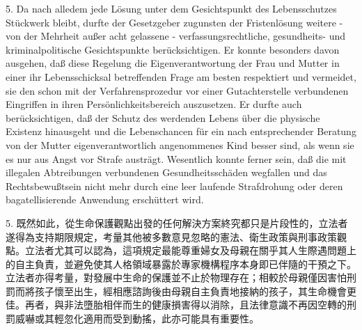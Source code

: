 \documentclass[12pt]{article}
\begin{document}
\syncleft
\begin{sourcepara}
5. Da nach alledem jede Lösung unter dem Gesichtspunkt des Lebensschutzes Stückwerk bleibt, durfte der Gesetzgeber zugunsten der Fristenlösung weitere - von der Mehrheit außer acht gelassene - verfassungsrechtliche, gesundheits- und kriminalpolitische Gesichtspunkte berücksichtigen. Er konnte besonders davon ausgehen, daß diese Regelung die Eigenverantwortung der Frau und Mutter in einer ihr Lebensschicksal betreffenden Frage am besten respektiert und vermeidet, sie den schon mit der Verfahrensprozedur vor einer Gutachterstelle verbundenen Eingriffen in ihren Persönlichkeitsbereich auszusetzen. Er durfte auch berücksichtigen, daß der Schutz des werdenden Lebens über die physische Existenz hinausgeht und die Lebenschancen für ein nach entsprechender Beratung von der Mutter eigenverantwortlich angenommenes Kind besser sind, als wenn sie es nur aus Angst vor Strafe austrägt. Wesentlich konnte ferner sein, daß die mit illegalen Abtreibungen verbundenen Gesundheitsschäden wegfallen und das Rechtsbewußtsein nicht mehr durch eine leer laufende Strafdrohung oder deren bagatellisierende Anwendung erschüttert wird.
\end{sourcepara}
\begin{transpara}
5. 既然如此，從生命保護觀點出發的任何解決方案終究都只是片段性的，立法者遂得為支持期限規定，考量其他被多數意見忽略的憲法、衛生政策與刑事政策觀點。立法者尤其可以認為，這項規定最能尊重婦女及母親在關乎其人生際遇問題上的自主負責，並避免使其人格領域暴露於專家機構程序本身即已伴隨的干預之下。立法者亦得考量，對發展中生命的保護並不止於物理存在；相較於母親僅因害怕刑罰而將孩子懷至出生，經相應諮詢後由母親自主負責地接納的孩子，其生命機會更佳。再者，與非法墮胎相伴而生的健康損害得以消除，且法律意識不再因空轉的刑罰威嚇或其輕忽化適用而受到動搖，此亦可能具有重要性。
\end{transpara}
\end{document}
